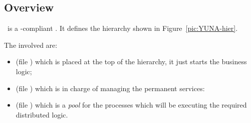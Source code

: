 \subsection{Overview} \label{sub:YunaOverview}

\YUNA\ is a \OTP-compliant . It defines the hierarchy
shown in Figure~\ref{pic:YUNA-hier}.


The involved  are:
\begin{itemize}

    \item   {} (file ) which is
            placed at the top of the hierarchy, it just starts the
            business logic;

    \item   {} (file )
            which is in charge of managing the permanent services:

    \item   {} (file )
            which is a \emph{pool} for the processes which will be
            executing the required distributed logic.

\end{itemize}

